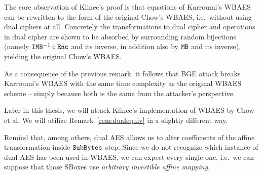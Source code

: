	\begin{remark}
	\label{rem:dualequiv}
		The core observation of Klinec's proof is that equations of Karroumi's WBAES can be rewritten to the form of the original Chow's WBAES, i.e.\ without using dual ciphers at all. Concretely the transformations to dual cipher and operations in dual cipher are shown to be absorbed by surrounding random bijections (namely $\texttt{IMB}^{-1}\circ\texttt{Enc}$ and its inverse, in addition also by $\texttt{MB}$ and its inverse), yielding the original Chow's WBAES.
	\end{remark}
	
	As a consequence of the previous remark, it follows that BGE attack breaks Karroumi's WBAES with the same time complexity as the original WBAES scheme -- simply because both is the same from the attacker's perspective.
	
	\begin{note}
	\label{note:dualsbox}
		Later in this thesis, we will attack Klinec's implementation \cite{klinec2013implementation} of WBAES by Chow et al. We will utilize Remark~\ref{rem:dualequiv} in a slightly different way.
		
		Remind that, among others, dual AES allows us to alter coefficients of the affine transformation inside $\texttt{SubBytes}$ step. Since we do not recognize which instance of dual AES has been used in WBAES, we can expect every single one, i.e.\ we can suppose that those SBoxes use {\em arbitrary invertible affine mapping}.
	\end{note}
	
